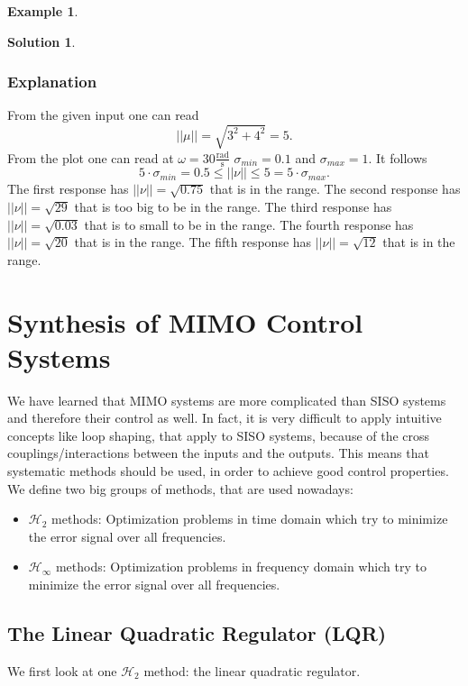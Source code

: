 \documentclass[a4paper,12 pt]{article}
\numberwithin{equation}{section}
\theoremstyle{definition}
\newtheorem{bsp}{Example}
\theoremstyle{remark}
\theoremstyle{definition}
\newtheorem*{lsg}{Solution}
\theoremstyle{definition}
\theoremstyle{definition}
\theoremstyle{remark}
\begin{document}
\begin{bsp}
\begin{lsg}
  \subsubsection*{Explanation}
  From the given input one can read
  \begin{equation*}
  ||\mu||=\sqrt{3^2+4^2}=5.
  \end{equation*}
  From the plot one can read at $\omega=30\frac{\text{rad}}{\text{s}}$ $\sigma_{min}=0.1$ and $\sigma_{max}=1$. It follows
  \begin{equation*}
  5\cdot \sigma_{min}=0.5\leq ||\nu||\leq 5=5\cdot \sigma_{max}.
  \end{equation*}
  The first response has $||\nu||=\sqrt{0.75}$ that is in the range. The second response has $||\nu||=\sqrt{29}$ that is too big to be in the range. The third response has $||\nu||=\sqrt{0.03}$ that is to small to be in the range. The fourth response has $||\nu||=\sqrt{20}$ that is in the range. The fifth response has $||\nu||=\sqrt{12}$ that is in the range. 

\end{lsg}

\end{bsp}

\newpage 
\section{Synthesis of MIMO Control Systems}
We have learned that MIMO systems are more complicated than SISO systems and therefore their control as well. In fact, it is very difficult to apply intuitive concepts like loop shaping, that apply to SISO systems, because of the cross couplings/interactions between the inputs and the outputs. This means that systematic methods should be used, in order to achieve good control properties. We define two big groups of methods, that are used nowadays:
\begin{itemize}
\item $\mathscr{H}_2$ methods: Optimization problems in time domain which try to minimize the error signal over all frequencies.
\item $\mathscr{H}_\infty$ methods: Optimization problems in frequency domain which try to minimize the error signal over all frequencies.
\end{itemize}
\subsection{The Linear Quadratic Regulator (LQR)}
We first look at one $\mathscr{H}_2$ method: the linear quadratic regulator.
\end{document}
